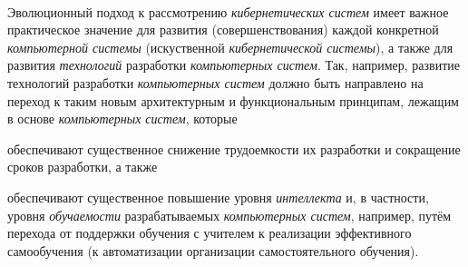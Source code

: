 \begin{scnsubstruct}
{        \\Эволюционный подход к рассмотрению \textit{кибернетических систем} имеет важное практическое значение для развития (совершенствования) каждой конкретной \textit{компьютерной системы} (искуственной \textit{кибернетической системы}), а также для развития \textit{технологий} разработки \textit{компьютерных систем}. Так, например, развитие технологий разработки \textit{компьютерных систем} должно быть направлено на переход к таким новым архитектурным и функциональным принципам, лежащим в основе \textit{компьютерных систем}, которые\begin{scnitemize}

            \item обеспечивают существенное снижение трудоемкости их разработки и сокращение сроков разработки, а также
            \item обеспечивают существенное повышение уровня \textit{интеллекта} и, в частности, уровня \textit{обучаемости} разрабатываемых \textit{компьютерных систем}, например, путём перехода от поддержки обучения с учителем к реализации эффективного самообучения (к автоматизации организации самостоятельного обучения).\end{scnitemize}
    }
\end{scnsubstruct}
